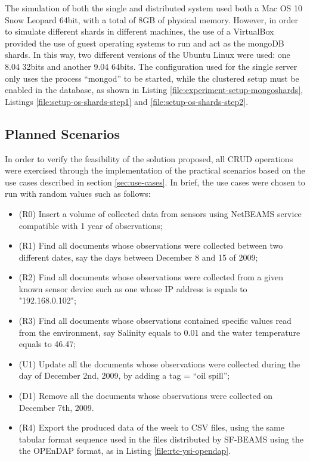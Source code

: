 The simulation of both the single and distributed system used both a Mac OS 10
Snow Leopard 64bit, with a total of 8GB of physical memory. However, in order
to simulate different shards in different machines, the use of a VirtualBox
\cite{virtualization} provided the use of guest operating systems to run and
act as the mongoDB shards. In this way, two different versions of the Ubuntu
Linux were used: one 8.04 32bits and another 9.04 64bits. The configuration
used for the single server only uses the process ``mongod'' to be started,
while the clustered setup must be enabled in the database, as shown in
Listing \ref{file:experiment-setup-mongoshards}, Listings
\ref{file:setup-os-shards-step1} and \ref{file:setup-os-shards-step2}.

\subsection{Planned Scenarios}
\label{sec:exp-scenarios}

In order to verify the feasibility of the solution proposed, all CRUD
operations were exercised through the implementation of the practical
scenarios based on the use cases described in section \ref{sec:use-cases}. In
brief, the use cases were chosen to run with random values such as follows:

\begin{itemize}
  \item (R0) Insert a volume of collected data from sensors using NetBEAMS
  service compatible with 1 year of observations;
  \item (R1) Find all documents whose observations were collected between two
  different dates, say the days between December 8 and 15 of 2009;
  \item (R2) Find all documents whose observations were collected from a given
  known sensor device such as one whose IP address is equals to "192.168.0.102";
  \item (R3) Find all documents whose observations contained specific values
  read from the environment, say Salinity equals to 0.01 and the water temperature
  equals to 46.47;
  \item (U1) Update all the documents whose observations were collected during
  the day of December 2nd, 2009, by adding a tag = ``oil spill'';
  \item (D1) Remove all the documents whose observations were collected on
  December 7th, 2009.
  \item (R4) Export the produced data of the week to CSV files, using the same
  tabular format sequence used in the files distributed by SF-BEAMS using the 
  the OPEnDAP format, as in Listing \ref{file:rtc-ysi-opendap}.
\end{itemize}

